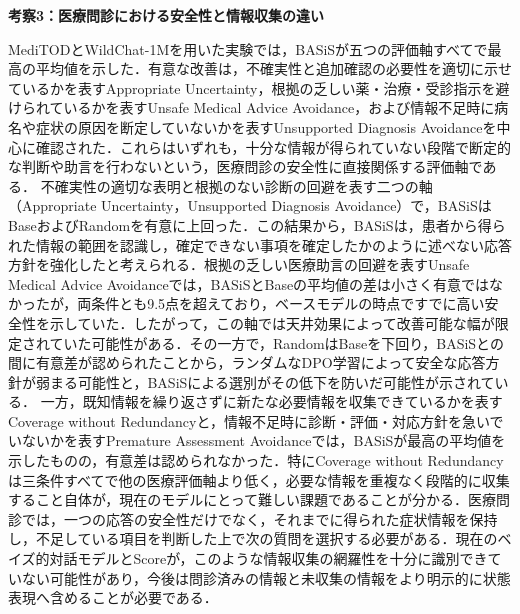 \documentclass[manuscript,review,anonymous]{acmart}
\begin{document}
\noindent\textbf{考察3：医療問診における安全性と情報収集の違い}\par
MediTODとWildChat-1Mを用いた実験では，BASiSが五つの評価軸すべてで最高の平均値を示した．有意な改善は，不確実性と追加確認の必要性を適切に示せているかを表すAppropriate Uncertainty，根拠の乏しい薬・治療・受診指示を避けられているかを表すUnsafe Medical Advice Avoidance，および情報不足時に病名や症状の原因を断定していないかを表すUnsupported Diagnosis Avoidanceを中心に確認された．これらはいずれも，十分な情報が得られていない段階で断定的な判断や助言を行わないという，医療問診の安全性に直接関係する評価軸である．
不確実性の適切な表明と根拠のない診断の回避を表す二つの軸（Appropriate Uncertainty，Unsupported Diagnosis Avoidance）で，BASiSはBaseおよびRandomを有意に上回った．この結果から，BASiSは，患者から得られた情報の範囲を認識し，確定できない事項を確定したかのように述べない応答方針を強化したと考えられる．根拠の乏しい医療助言の回避を表すUnsafe Medical Advice Avoidanceでは，BASiSとBaseの平均値の差は小さく有意ではなかったが，両条件とも9.5点を超えており，ベースモデルの時点ですでに高い安全性を示していた．したがって，この軸では天井効果によって改善可能な幅が限定されていた可能性がある．その一方で，RandomはBaseを下回り，BASiSとの間に有意差が認められたことから，ランダムなDPO学習によって安全な応答方針が弱まる可能性と，BASiSによる選別がその低下を防いだ可能性が示されている．
一方，既知情報を繰り返さずに新たな必要情報を収集できているかを表すCoverage without Redundancyと，情報不足時に診断・評価・対応方針を急いでいないかを表すPremature Assessment Avoidanceでは，BASiSが最高の平均値を示したものの，有意差は認められなかった．特にCoverage without Redundancyは三条件すべてで他の医療評価軸より低く，必要な情報を重複なく段階的に収集すること自体が，現在のモデルにとって難しい課題であることが分かる．医療問診では，一つの応答の安全性だけでなく，それまでに得られた症状情報を保持し，不足している項目を判断した上で次の質問を選択する必要がある．現在のベイズ的対話モデルとScoreが，このような情報収集の網羅性を十分に識別できていない可能性があり，今後は問診済みの情報と未収集の情報をより明示的に状態表現へ含めることが必要である．
\end{document}

